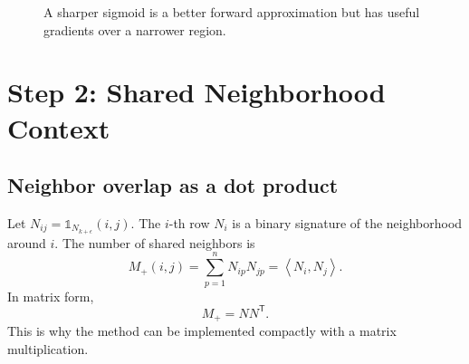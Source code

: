 \documentclass[11pt,oneside,openany]{book}
\theoremstyle{myplain}
\theoremstyle{definition}
\newcommand{\ind}{\mathds{1}}
\newcommand{\inner}[2]{\left\langle #1,#2\right\rangle}
\newcommand{\transpose}{\mathsf{T}}
\newcommand{\paperEq}[1]{\tag{P#1}}
\begin{document}
\begin{figure}[H]
\centering
{}
\caption{A sharper sigmoid is a better forward approximation but has useful gradients over a narrower region.}
\label{fig:sigmoid}
\end{figure}

\chapter{Step 2: Shared Neighborhood Context}
\label{chap:step2}

\section{Neighbor overlap as a dot product}

Let $N_{ij}=\ind_{N_{k+\epsilon}}(i,j)$. The $i$-th row $N_i$ is a binary signature of the neighborhood around $i$. The number of shared neighbors is
\begin{equation}
  M_+(i,j)=\sum_{p=1}^{n}N_{ip}N_{jp}
  =\inner{N_i}{N_j}.
  \label{eq:mplus}
\end{equation}
In matrix form,
\begin{equation*}
  M_+=NN^\transpose.
\paperEq{22}
\label{eq:mplus-matrix}
\end{equation*}
This is why the method can be implemented compactly with a matrix multiplication.
\end{document}
